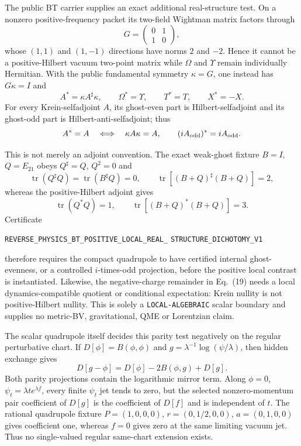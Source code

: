 \documentclass[11pt]{article}
\theoremstyle{definition}
\theoremstyle{remark}
\begin{document}
The public BT carrier supplies an exact additional real-structure test.  On
a nonzero positive-frequency packet its two-field Wightman matrix factors
through
\[
 G=\begin{pmatrix}0&1\\1&0\end{pmatrix},
\]
whose $(1,1)$ and $(1,-1)$ directions have norms $2$ and $-2$.  Hence it
cannot be a positive-Hilbert vacuum two-point matrix while $\Omega$ and
$\Upsilon$ remain individually Hermitian.  With the public fundamental
symmetry $\kappa=G$, one instead has $G\kappa=I$ and
\[
 A^*=\kappa A^\sharp\kappa,\qquad
 \Omega^*=\Upsilon,\qquad T^*=T,\qquad X^*=-X.
\]
For every Krein-selfadjoint $A$, its ghost-even part is
Hilbert-selfadjoint and its ghost-odd part is Hilbert-anti-selfadjoint; thus
\[
 A^*=A\quad\Longleftrightarrow\quad\kappa A\kappa=A,
 \qquad (iA_{\rm odd})^*=iA_{\rm odd}.
\]

This is not merely an adjoint convention.  The exact weak-ghost fixture
$B=I$, $Q=E_{21}$ obeys $Q^\sharp=Q$, $Q^2=0$ and
\[
 \operatorname{tr}(Q^\sharp Q)
 =\operatorname{tr}(B^\sharp Q)=0,
 \qquad \operatorname{tr}[(B+Q)^\sharp(B+Q)]=2,
\]
whereas the positive-Hilbert adjoint gives
\[
 \operatorname{tr}(Q^*Q)=1,\qquad
 \operatorname{tr}[(B+Q)^*(B+Q)]=3.
\]
Certificate
\par\noindent
\texttt{REVERSE\_PHYSICS\_BT\_POSITIVE\_LOCAL\_REAL\_}
\allowbreak\texttt{STRUCTURE\_DICHOTOMY\_V1}
\par\noindent
therefore requires the compact quadrupole to have certified internal
ghost-evenness, or a controlled $i$-times-odd projection, before the positive
local contrast is instantiated.  Likewise, the negative-charge remainder in
Eq.~(19) needs a local dynamics-compatible quotient or conditional
expectation: Krein nullity is not positive-Hilbert nullity.  This is solely a
\texttt{LOCAL-}\allowbreak\texttt{ALGEBRAIC} scalar boundary and supplies no metric-BV,
gravitational, QME or Lorentzian claim.

The scalar quadrupole itself decides this parity test negatively on the
regular perturbative chart.  If $D[\phi]=B(\phi,\phi)$ and
$g=\lambda^{-1}\log(\psi/\lambda)$, then hidden exchange gives
\[
 D[g-\phi]=D[\phi]-2B(\phi,g)+D[g].
\]
Both parity projections contain the logarithmic mirror term.  Along
$\phi=0$, $\psi_t=\lambda t e^{\lambda f}$, every finite $\psi_t$ jet tends
to zero, but the selected nonzero-momentum pair coefficient of $D[g]$ is the
coefficient of $D[f]$ and is independent of $t$.  The rational quadrupole
fixture $P=(1,0,0,0)$, $r=(0,1/2,0,0)$, $a=(0,1,0,0)$ gives coefficient one,
whereas $f=0$ gives zero at the same limiting vacuum jet.  Thus no
single-valued regular same-chart extension exists.
\end{document}
